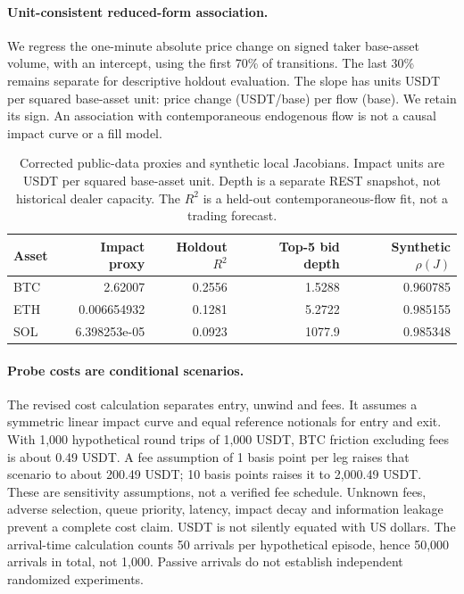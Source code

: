 \documentclass[10pt,twocolumn,letterpaper]{article}
\theoremstyle{definition}
\theoremstyle{remark}
\begin{document}
\paragraph{Unit-consistent reduced-form association.}
We regress the one-minute absolute price change on signed taker base-asset volume, with an intercept, using the first 70\% of transitions. The last 30\% remains separate for descriptive holdout evaluation. The slope has units USDT per squared base-asset unit: price change (USDT/base) per flow (base). We retain its sign. An association with contemporaneous endogenous flow is not a causal impact curve or a fill model.
\begin{table}[htbp]\centering\small
\caption{Corrected public-data proxies and synthetic local Jacobians. Impact units are USDT per squared base-asset unit. Depth is a separate REST snapshot, not historical dealer capacity. The $R^2$ is a held-out contemporaneous-flow fit, not a trading forecast.}
\label{tab:gate24_empirical}
\begin{tabular}{lrrrr}\toprule
Asset & Impact proxy & Holdout $R^2$ & Top-5 bid depth & Synthetic $\rho(J)$\\\midrule
BTC & 2.62007 & 0.2556 & 1.5288 & 0.960785 \\
ETH & 0.006654932 & 0.1281 & 5.2722 & 0.985155 \\
SOL & 6.398253e-05 & 0.0923 & 1077.9 & 0.985348 \\
\bottomrule\end{tabular}\end{table}

\paragraph{Probe costs are conditional scenarios.}
The revised cost calculation separates entry, unwind and fees. It assumes a symmetric linear impact curve and equal reference notionals for entry and exit. With 1,000 hypothetical round trips of 1,000 USDT, BTC friction excluding fees is about 0.49 USDT. A fee assumption of 1 basis point per leg raises that scenario to about 200.49 USDT; 10 basis points raises it to 2,000.49 USDT. These are sensitivity assumptions, not a verified fee schedule. Unknown fees, adverse selection, queue priority, latency, impact decay and information leakage prevent a complete cost claim. USDT is not silently equated with US dollars. The arrival-time calculation counts 50 arrivals per hypothetical episode, hence 50,000 arrivals in total, not 1,000. Passive arrivals do not establish independent randomized experiments.
\end{document}
